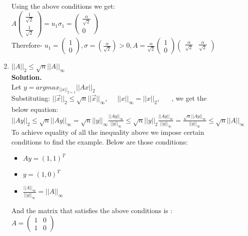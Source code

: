\documentclass[12pt, oneside]{article}   	%
\begin{document}
\begin{enumerate}
\begin{enumerate}
\begin{enumerate}
		Using the above conditions we get:\\
		$A(\begin{array}{c}\frac{1}{\sqrt{2}}\\\frac{1}{\sqrt{2}}
		\end{array})= u_1 \sigma_1= (\begin{array}{c}\frac{\alpha}{\sqrt{2}}\\0
		\end{array})$\\
		
		Therefore- $u_1=(\begin{array}{c}1\\0
		\end{array}), \sigma=(\frac{\alpha}{\sqrt{2}})>0,  A= \frac{\alpha}{\sqrt{2}}(\begin{array}{c}1\\0
		\end{array})(\begin{array}{cc}\frac{\alpha}{\sqrt{2}}&\frac{\alpha}{\sqrt{2}}
		\end{array})$\\
		
		
		\item $||A||_2 \leq \sqrt{n} ||A||_\infty$\\
		
		\textbf{Solution.}\\
		
		Let $y=argmax_{||x||_{2=1}}||Ax||_2$\\
		
		Substituting: $||\vec{x}||_2 \leq \sqrt{n} ||\vec{x}||_\infty$,\ \ \ $||x||_\infty= ||x||_2$,  \ \ \ , we get the below equation:\\
		$||Ay||_2 \leq \sqrt{n}||Ay||_\infty =\sqrt{n}||y||_\infty \frac{||Ay||_\infty}{||y||_\infty}
		 \leq\sqrt{n}||y||_2\frac{||Ay||_\infty}{||y||_\infty}
		  =\frac{\sqrt{n}||Ay||_\infty}{||y||_\infty} \leq \sqrt{n}||A||_\infty$\\
		  
		  To achieve equality of all the inequality above we impose certain conditions to find the example. Below are those conditions:\\
		  
			\begin{itemize}
			\item $Ay=(1,1)^T$ 
			\item $y=(1,0)^T$
			\item $\frac{||A||_\infty}{||y||_\infty}=||A||_\infty$
		\end{itemize}
	And the matrix that satisfies the above conditions is :\\
	$A= (\begin{array}{cc}
	1&0\\1&0
	\end{array})$
		

\end{enumerate}
\end{enumerate}
\end{enumerate}
\end{document}
